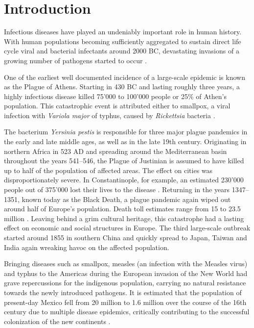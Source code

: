 \chapter{Introduction}

Infectious diseases have played an undeniably important role in human history. With human populations becoming sufficiently aggregated to sustain direct life cycle viral and bacterial infectants around 2000 BC, devastating invasions of a growing number of pathogens started to occur \citep{Dobson1996}.

One of the earliest well documented incidence of a large-scale epidemic is known as the Plague of Athens. Starting in 430 BC and lasting roughly three years, a highly infectious disease killed 75'000 to 100'000 people or 25\% of Athen's population. This catastrophic event is attributed either to smallpox, a viral infection with \textit{Variola major} of typhus, caused by \textit{Rickettsia} bacteria \citep{Littman2009}.

The bacterium \textit{Yersinia pestis} is responsible for three major plague pandemics in the early and late middle ages, as well as in the late 19th century. Originating in northern Africa in 523 AD and spreading around the Mediterranean basin throughout the years 541--546, the Plague of Justinian is assumed to have killed up to half of the population of affected areas. The effect on cities was disproportionately severe. In Constantinople, for example, an estimated 230'000 people out of 375'000 lost their lives to the disease \citep{Treadgold1997}. Returning in the years 1347--1351, known today as the Black Death, a plague pandemic again wiped out around half of Europe's population. Death toll estimates range from 15 to 23.5 million \citep{Zietz2004}. Leaving behind a grim cultural heritage, this catastrophe had a lasting effect on economic and social structures in Europe. The third large-scale outbreak started around 1855 in southern China and quickly spread to Japan, Taiwan and India again wreaking havoc on the affected population.

Bringing diseases such as smallpox, measles (an infection with the Measles virus) and typhus to the Americas during the European invasion of the New World had grave repercussions for the indigenous population, carrying no natural resistance towards the newly introduced pathogens. It is estimated that the population of present-day Mexico fell from 20 million to 1.6 million over the course of the 16th century due to multiple disease epidemics, critically contributing to the successful colonization of the new continents \citep{Dobson1996}.

